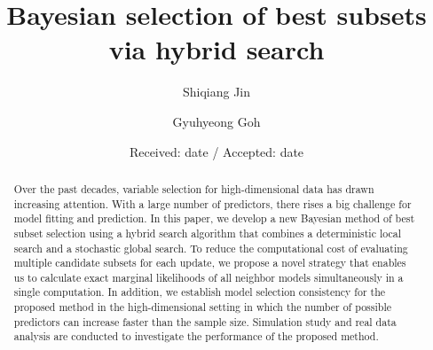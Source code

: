 \title{Bayesian selection of best subsets via hybrid search%
}


\author{Shiqiang Jin         \and
        Gyuhyeong Goh %
}



\date{Received: date / Accepted: date}


\maketitle

\begin{abstract}
Over the past decades, variable selection for high-dimensional data has drawn increasing attention. With a large number of predictors, there rises a big challenge for model fitting and prediction. In this paper, we develop a new Bayesian method of best subset selection using a hybrid search algorithm that combines a deterministic local search and a stochastic global search. To reduce the computational cost of evaluating multiple candidate subsets for each update, we propose a novel strategy that enables us to calculate exact marginal likelihoods of all neighbor models simultaneously in a single computation. In addition, we establish model selection consistency for the proposed method in the high-dimensional setting in which the number of possible predictors can increase faster than the sample size. Simulation study and real data analysis are conducted to investigate the performance of the proposed method.
\end{abstract}


